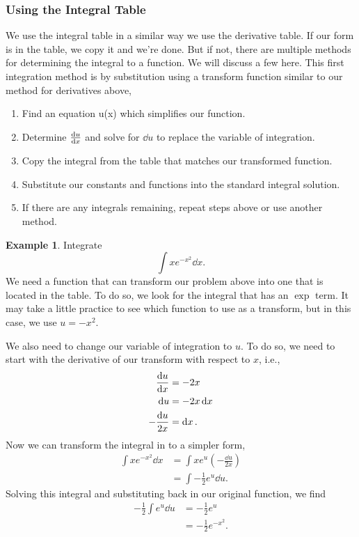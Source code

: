 \documentclass[final,a4paper,12pt]{article}
\theoremstyle{definition}
\newtheorem{example}{Example}[section]
\begin{document}
\subsubsection{Using the Integral Table}
We use the integral table in a similar way we use the derivative table.  If our
form is in the table, we copy it and we're done.  But if not, there are multiple
methods for determining the integral to a function.  We will discuss a few here.
This first integration method is by substitution using a transform function
similar to our method for derivatives above,
\begin{enumerate}
    \item Find an equation u(x) which simplifies our function.
    \item Determine $\dv{u}{x}$ and solve for $\dd{u}$ to replace the variable of
    integration.
    \item Copy the integral from the table that matches our transformed
    function.
    \item Substitute our constants and functions into the standard integral solution.
    \item If there are any integrals remaining, repeat steps above or use
    another method.
\end{enumerate}

\begin{example}
    Integrate
    \begin{equation*}
        \int x e^{-x^2} \dd{x} .
    \end{equation*}
    We need a function that can transform our problem above into one that is
    located in the table.  To do so, we look for the integral that has an $\exp$
    term.  It may take a little practice to see which function to use as a
    transform, but in this case, we use $u = -x^2$.
    
    We also need to change our variable of integration to $u$.  To do so, we
    need to start with the derivative of our transform with respect to
    $x$, i.e.,
    \begin{align*}
        \dv{u}{x} &= -2 x \\
        \dd{u} &= -2 x \dd{x} \\
        -\frac{\dd{u}}{2 x} &= \dd{x} .
    \end{align*}
    Now we can transform the integral in to a simpler form,
    \begin{align*}
        \int x e^{-x^2} \dd{x} &= \int x e^u \left(- \frac{\dd{u}}{2 x} \right) \\
        &= \int -\frac{1}{2} e^u \dd{u} .
    \end{align*}
    Solving this integral and substituting back in our original function, we
    find
    \begin{align*}
        -\frac{1}{2} \int e^u \dd{u} &= -\frac{1}{2} e^u \\
        &= -\frac{1}{2} e^{-x^2} .
    \end{align*}

\end{example}
\end{document}

